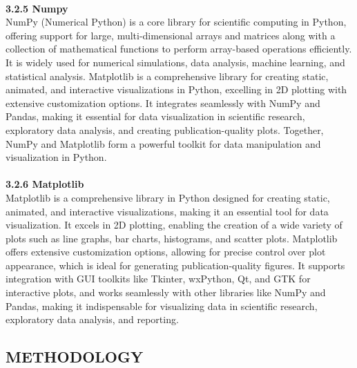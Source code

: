 \documentclass[12pt, English]{article}
\begin{document}
\\
\textbf{3.2.5 Numpy}\\
NumPy (Numerical Python) is a core library for scientific computing in Python, offering support for large, multi-dimensional arrays and matrices along with a collection of mathematical functions to perform array-based operations efficiently. It is widely used for numerical simulations, data analysis, machine learning, and statistical analysis. Matplotlib is a comprehensive library for creating static, animated, and interactive visualizations in Python, excelling in 2D plotting with extensive customization options. It integrates seamlessly with NumPy and Pandas, making it essential for data visualization in scientific research, exploratory data analysis, and creating publication-quality plots. Together, NumPy and Matplotlib form a powerful toolkit for data manipulation and visualization in Python.\\
\\
\textbf{3.2.6 Matplotlib}\\
Matplotlib is a comprehensive library in Python designed for creating static, animated, and interactive visualizations, making it an essential tool for data visualization. It excels in 2D plotting, enabling the creation of a wide variety of plots such as line graphs, bar charts, histograms, and scatter plots. Matplotlib offers extensive customization options, allowing for precise control over plot appearance, which is ideal for generating publication-quality figures. It supports integration with GUI toolkits like Tkinter, wxPython, Qt, and GTK for interactive plots, and works seamlessly with other libraries like NumPy and Pandas, making it indispensable for visualizing data in scientific research, exploratory data analysis, and reporting.
\newpage
\begin{center}
\section{ \Large METHODOLOGY}
\end{center}
\end{document}
